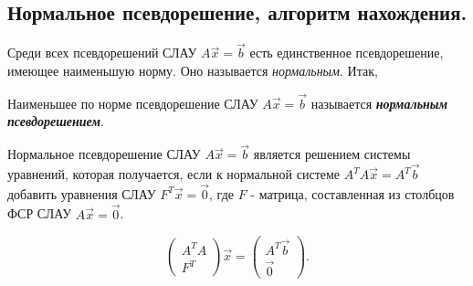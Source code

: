 \subsection{
    Нормальное псевдорешение, алгоритм нахождения.
}


Среди всех псевдорешений СЛАУ $A\vec{x} = \vec{b}$ есть единственное псевдорешение, имеющее наименьшую норму. Оно называется \textit{нормальным}. Итак,

\begin{definition}
    Наименьшее по норме псевдорешение СЛАУ $A\vec{x} = \vec{b}$ называется \textbf{\textit{нормальным псевдорешением}}.
\end{definition}

Нормальное псевдорешение СЛАУ $A\vec{x} = \vec{b}$ является решением системы уравнений, которая получается, если к нормальной системе $A^TA\vec{x} = A^T\vec{b}$ добавить уравнения СЛАУ $F^T\vec{x} = \vec{0}$, где $F$ - матрица, составленная из столбцов ФСР СЛАУ $A\vec{x} = \vec{0}$.

\begin{equation*}
    \left(\begin{array}{c}
        A^TA \\
        F^T
    \end{array}\right)\vec{x}
    =
    \left(\begin{array}{c}
        A^T\vec{b} \\
        \vec{0}
    \end{array}\right)
.\end{equation*}
